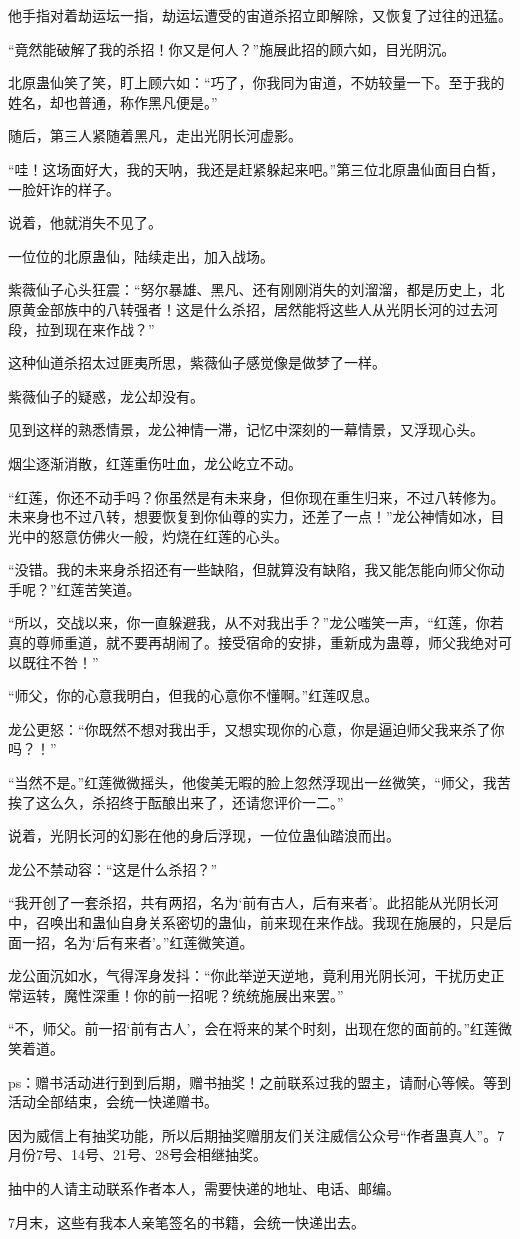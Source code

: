 \begin{this_body}
他手指对着劫运坛一指，劫运坛遭受的宙道杀招立即解除，又恢复了过往的迅猛。

“竟然能破解了我的杀招！你又是何人？”施展此招的顾六如，目光阴沉。

北原蛊仙笑了笑，盯上顾六如：“巧了，你我同为宙道，不妨较量一下。至于我的姓名，却也普通，称作黑凡便是。”

随后，第三人紧随着黑凡，走出光阴长河虚影。

“哇！这场面好大，我的天呐，我还是赶紧躲起来吧。”第三位北原蛊仙面目白皙，一脸奸诈的样子。

说着，他就消失不见了。

一位位的北原蛊仙，陆续走出，加入战场。

紫薇仙子心头狂震：“努尔暴雄、黑凡、还有刚刚消失的刘溜溜，都是历史上，北原黄金部族中的八转强者！这是什么杀招，居然能将这些人从光阴长河的过去河段，拉到现在来作战？”

这种仙道杀招太过匪夷所思，紫薇仙子感觉像是做梦了一样。

紫薇仙子的疑惑，龙公却没有。

见到这样的熟悉情景，龙公神情一滞，记忆中深刻的一幕情景，又浮现心头。

烟尘逐渐消散，红莲重伤吐血，龙公屹立不动。

“红莲，你还不动手吗？你虽然是有未来身，但你现在重生归来，不过八转修为。未来身也不过八转，想要恢复到你仙尊的实力，还差了一点！”龙公神情如冰，目光中的怒意仿佛火一般，灼烧在红莲的心头。

“没错。我的未来身杀招还有一些缺陷，但就算没有缺陷，我又能怎能向师父你动手呢？”红莲苦笑道。

“所以，交战以来，你一直躲避我，从不对我出手？”龙公嗤笑一声，“红莲，你若真的尊师重道，就不要再胡闹了。接受宿命的安排，重新成为蛊尊，师父我绝对可以既往不咎！”

“师父，你的心意我明白，但我的心意你不懂啊。”红莲叹息。

龙公更怒：“你既然不想对我出手，又想实现你的心意，你是逼迫师父我来杀了你吗？！”

“当然不是。”红莲微微摇头，他俊美无暇的脸上忽然浮现出一丝微笑，“师父，我苦挨了这么久，杀招终于酝酿出来了，还请您评价一二。”

说着，光阴长河的幻影在他的身后浮现，一位位蛊仙踏浪而出。

龙公不禁动容：“这是什么杀招？”

“我开创了一套杀招，共有两招，名为‘前有古人，后有来者’。此招能从光阴长河中，召唤出和蛊仙自身关系密切的蛊仙，前来现在来作战。我现在施展的，只是后面一招，名为‘后有来者’。”红莲微笑道。

龙公面沉如水，气得浑身发抖：“你此举逆天逆地，竟利用光阴长河，干扰历史正常运转，魔性深重！你的前一招呢？统统施展出来罢。”

“不，师父。前一招‘前有古人’，会在将来的某个时刻，出现在您的面前的。”红莲微笑着道。

ps：赠书活动进行到到后期，赠书抽奖！之前联系过我的盟主，请耐心等候。等到活动全部结束，会统一快递赠书。

因为威信上有抽奖功能，所以后期抽奖赠朋友们关注威信公众号“作者蛊真人”。7月份7号、14号、21号、28号会相继抽奖。

抽中的人请主动联系作者本人，需要快递的地址、电话、邮编。

7月末，这些有我本人亲笔签名的书籍，会统一快递出去。

\end{this_body}

